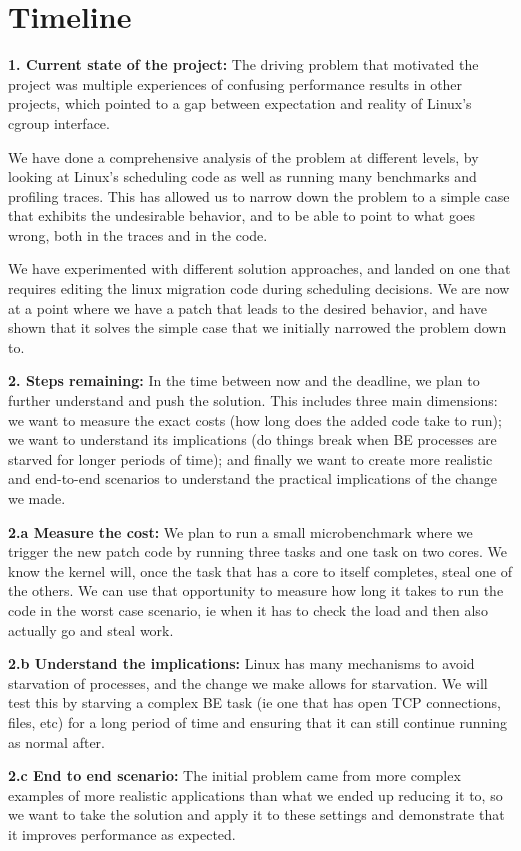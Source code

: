 
\section{Timeline}
\label{sec:timeline}

\textbf{1. Current state of the project:} 
The driving problem that motivated the project was multiple experiences of
confusing performance results in other projects, which pointed to a gap between
expectation and reality of Linux's cgroup interface. 

We have done a comprehensive analysis of the problem at different levels, by
looking at Linux's scheduling code as well as running many benchmarks and
profiling traces. This has allowed us to narrow down the problem to a simple
case that exhibits the undesirable behavior, and to be able to point to what
goes wrong, both in the traces and in the code.

We have experimented with different solution approaches, and landed on one that
requires editing the linux migration code during scheduling decisions. We are
now at a point where we have a patch that leads to the desired behavior, and
have shown that it solves the simple case that we initially narrowed the problem
down to.

\textbf{2. Steps remaining:} In the time between now and the deadline, we plan
to further understand and push the solution. This includes three main
dimensions: we want to measure the exact costs (how long does the added code
take to run); we want to understand its implications (do things break when BE
processes are starved for longer periods of time); and finally we want to create
more realistic and end-to-end scenarios to understand the practical implications
of the change we made.

\textbf{2.a Measure the cost:} We plan to run a small microbenchmark where we
trigger the new patch code by running three \schednormal{} tasks and one
\schedidle{} task on two cores. We know the kernel will, once the \schednormal{}
task that has a core to itself completes, steal one of the others. We can use
that opportunity to measure how long it takes to run the code in the worst case
scenario, ie when it has to check the load and then also actually go and steal work.

\textbf{2.b Understand the implications:} Linux has many mechanisms to avoid
starvation of processes, and the change we make allows for starvation. We will
test this by starving a complex BE task (ie one that has open TCP connections,
files, etc) for a long period of time and ensuring that it can still continue
running as normal after.

\textbf{2.c End to end scenario:} The initial problem came from more complex
examples of more realistic applications than what we ended up reducing it to, so
we want to take the solution and apply it to these settings and demonstrate that
it improves performance as expected.


